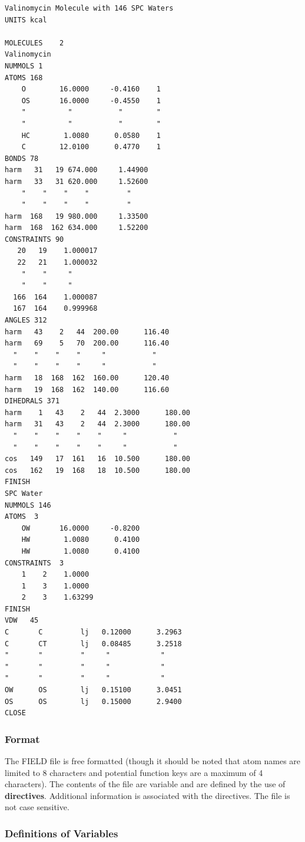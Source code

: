 \begin{verbatim}
Valinomycin Molecule with 146 SPC Waters
UNITS kcal

MOLECULES    2
Valinomycin
NUMMOLS 1
ATOMS 168
    O        16.0000     -0.4160    1
    OS       16.0000     -0.4550    1
    "          "           "        "
    "          "           "        "
    HC        1.0080      0.0580    1
    C        12.0100      0.4770    1
BONDS 78
harm   31   19 674.000     1.44900
harm   33   31 620.000     1.52600
    "    "    "    "         "
    "    "    "    "         "
harm  168   19 980.000     1.33500
harm  168  162 634.000     1.52200
CONSTRAINTS 90
   20   19    1.000017
   22   21    1.000032
    "    "     " 
    "    "     " 
  166  164    1.000087
  167  164    0.999968
ANGLES 312
harm   43    2   44  200.00      116.40
harm   69    5   70  200.00      116.40
  "    "    "    "     "           "
  "    "    "    "     "           "
harm   18  168  162  160.00      120.40
harm   19  168  162  140.00      116.60
DIHEDRALS 371
harm    1   43    2   44  2.3000      180.00
harm   31   43    2   44  2.3000      180.00
  "    "    "    "    "     "           "
  "    "    "    "    "     "           "
cos   149   17  161   16  10.500      180.00
cos   162   19  168   18  10.500      180.00
FINISH
SPC Water
NUMMOLS 146
ATOMS  3
    OW       16.0000     -0.8200
    HW        1.0080      0.4100
    HW        1.0080      0.4100
CONSTRAINTS  3
    1    2    1.0000
    1    3    1.0000
    2    3    1.63299
FINISH
VDW   45
C       C         lj   0.12000      3.2963
C       CT        lj   0.08485      3.2518
"       "         "     "            " 
"       "         "     "            " 
"       "         "     "            " 
OW      OS        lj   0.15100      3.0451
OS      OS        lj   0.15000      2.9400
CLOSE
\end{verbatim}

\subsubsection{Format}
The FIELD file is free formatted (though it should be noted that atom
names are limited to 8 characters and potential function keys are a
maximum of 4 characters). The contents of the file are variable
and are defined by the use of {\bf directives}. Additional information
is associated with the directives. The file is not case sensitive.

\subsubsection{Definitions of Variables}

